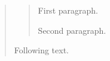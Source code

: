 \begin{quote}
\begin{quotation}
First paragraph.

Second paragraph.
   \end{quotation} %
Following text.
   \end{quote} %
